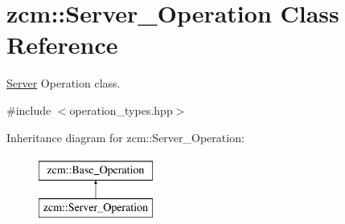 \hypertarget{classzcm_1_1Server__Operation}{\section{zcm\-:\-:Server\-\_\-\-Operation Class Reference}
\label{classzcm_1_1Server__Operation}
}


\hyperlink{classzcm_1_1Server}{Server} Operation class.  




{\ttfamily \#include $<$operation\-\_\-types.\-hpp$>$}

Inheritance diagram for zcm\-:\-:Server\-\_\-\-Operation\-:\begin{figure}[H]
\begin{center}
\leavevmode
\includegraphics[height=2.000000cm]{classzcm_1_1Server__Operation}
\end{center}
\end{figure}
